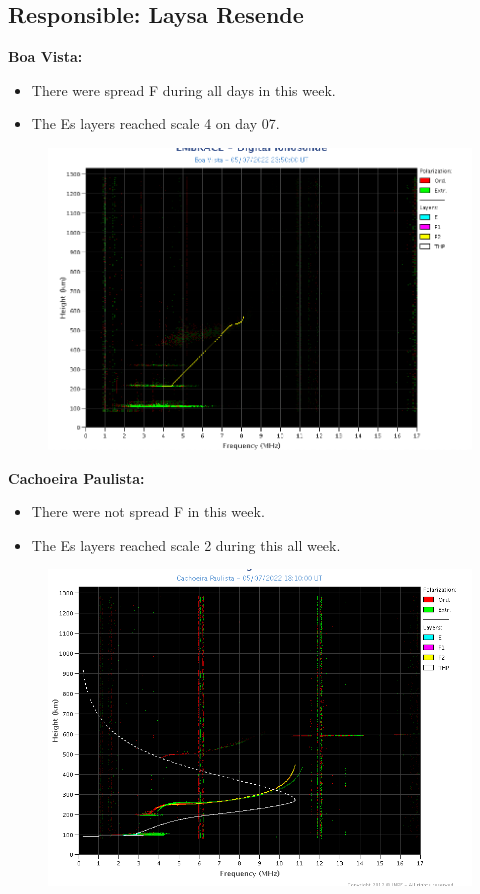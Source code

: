 \documentclass[a4paper, 10pt]{article}
\begin{document}
 \subsection{Responsible: Laysa Resende} 
 
\textbf{Boa Vista: }

 \begin{itemize}
\item There were spread F during all days in this week.
\item The Es layers reached scale 4 on day 07. 
\end{itemize}
\begin{figure}[H]
    \centering
    \includegraphics[width=14cm]{./figures//BoaVista.png}
\end{figure}

\textbf{Cachoeira Paulista:}

 \begin{itemize}
\item There were not spread F in this week.
\item The Es layers reached scale 2 during this all week. 
\end{itemize}
\begin{figure}[H]
    \centering
    \includegraphics[width=14cm]{./figures//CachoeiraPaulista.png}
\end{figure}
\end{document}
